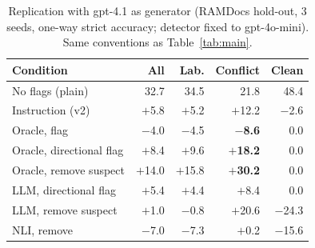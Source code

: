 \begin{table}[t]
\centering\footnotesize
\setlength{\tabcolsep}{3pt}
\begin{tabular}{lrrrr}
\toprule
Condition & All & Lab. & Conflict & Clean \\
\midrule
No flags (plain) & 32.7 & 34.5 & 21.8 & 48.4 \\
\midrule
Instruction (v2) & $+$5.8 & $+$5.2 & $+$12.2 & $-$2.6 \\
Oracle, flag & $-$4.0 & $-$4.5 & \textbf{$-$8.6} & 0.0 \\
Oracle, directional flag & $+$8.4 & $+$9.6 & \textbf{$+$18.2} & 0.0 \\
Oracle, remove suspect & $+$14.0 & $+$15.8 & \textbf{$+$30.2} & 0.0 \\
LLM, directional flag & $+$5.4 & $+$4.4 & $+$8.4 & 0.0 \\
LLM, remove suspect & $+$1.0 & $-$0.8 & $+$20.6 & $-$24.3 \\
NLI, remove & $-$7.0 & $-$7.3 & $+$0.2 & $-$15.6 \\
\bottomrule
\end{tabular}
\caption{Replication with gpt-4.1 as generator (RAMDocs hold-out, 3 seeds, one-way strict accuracy; detector fixed
to gpt-4o-mini). Same conventions as Table~\ref{tab:main}.}
\label{tab:gpt41}
\end{table}
